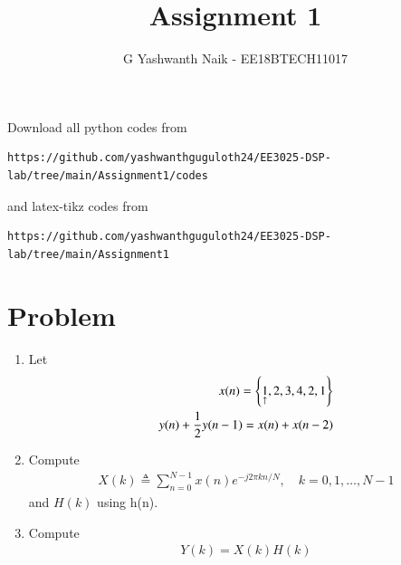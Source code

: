 \documentclass[journal,12pt,twocolumn]{IEEEtran}
\renewcommand\thesection{\arabic{section}}
\begin{document}
\def\putbox#1#2#3{\makebox[0in][l]{\makebox[#1][l]{}\raisebox{\baselineskip}[0in][0in]{\raisebox{#2}[0in][0in]{#3}}}}
     \def\rightbox#1{\makebox[0in][r]{#1}}
     \def\centbox#1{\makebox[0in]{#1}}
     \def\topbox#1{\raisebox{-\baselineskip}[0in][0in]{#1}}
     \def\midbox#1{\raisebox{-0.5\baselineskip}[0in][0in]{#1}}
\vspace{3cm}
\title{Assignment 1}
\author{G Yashwanth Naik - EE18BTECH11017}
\maketitle
\newpage
\bigskip
\renewcommand{\thefigure}{\theenumi}
\renewcommand{\thetable}{\theenumi}



Download all python codes from 
\begin{lstlisting}
https://github.com/yashwanthguguloth24/EE3025-DSP-lab/tree/main/Assignment1/codes
\end{lstlisting}
%
and latex-tikz codes from 
%
\begin{lstlisting}
https://github.com/yashwanthguguloth24/EE3025-DSP-lab/tree/main/Assignment1
\end{lstlisting}


\section{Problem}
\begin{enumerate}[label=\thesection.\arabic*.,ref=\thesection.\theenumi]
    
    \item Let
    \begin{align}
        x(n) = \cbrak{\underset{\uparrow}{1},2,3,4,2,1}
         \label{eq:equation0}\\
        y(n) + \frac{1}{2}y(n-1) = x(n) + x(n-2)	
        \label{eq:equation1}
    \end{align}
    
    \item Compute 
    \begin{align}
        X(k) \triangleq \sum_{n=0}^{N-1} x(n) e^{-j 2 \pi k n / N}, \quad k=0,1, \ldots, N-1
    \end{align}
    and $H(k)$ using h(n).
    
    \item Compute 
    \begin{align}
    Y(k) = X(k)H(k)
    \end{align}

\end{enumerate}
\end{document}
